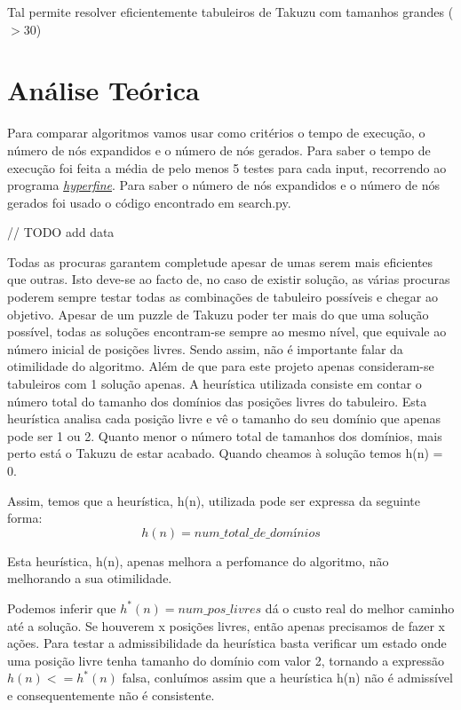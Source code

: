 \documentclass[12pt,a4paper]{article}
\begin{document}
  Tal permite resolver eficientemente tabuleiros de Takuzu com tamanhos grandes ($> 30$)
  

  \section{Análise Teórica}

  Para comparar algoritmos vamos usar como critérios o tempo de execução, o número de nós expandidos e o número de nós gerados.
  Para saber o tempo de execução foi feita a média de pelo menos 5 testes para cada input, recorrendo ao programa \href{https://github.com/sharkdp/hyperfine}{\textit{hyperfine}}.
  Para saber o número de nós expandidos e o número de nós gerados foi usado o código encontrado em search.py.

  // TODO add data

  
  Todas as procuras garantem completude apesar de umas serem mais eficientes que outras. Isto deve-se ao facto de, no caso de existir solução, as várias procuras poderem sempre testar todas as combinações de tabuleiro possíveis e chegar ao objetivo.
  Apesar de um puzzle de Takuzu poder ter mais do que uma solução possível, todas as soluções encontram-se sempre ao mesmo nível, que equivale ao número inicial de posições livres. Sendo assim, não é importante falar da otimilidade do algoritmo.
  Além de que para este projeto apenas consideram-se tabuleiros com 1 solução apenas.
  A heurística utilizada consiste em contar o número total do tamanho dos domínios das posições livres do tabuleiro.
  Esta heurística analisa cada posição livre e vê o tamanho do seu domínio que apenas pode ser 1 ou 2.
  Quanto menor o número total de tamanhos dos domínios, mais perto está o Takuzu de estar acabado.
  Quando cheamos à solução temos h(n) = 0.
  
  Assim, temos que a heurística, h(n), utilizada pode ser expressa da seguinte forma:
  $$
  h(n) = num\_total\_de\_domínios
  $$

  
  Esta heurística, h(n), apenas melhora a perfomance do algoritmo, não melhorando a sua otimilidade.

  Podemos inferir que $h^*(n) = num\_pos\_livres$ dá o custo real do melhor caminho até a solução. Se houverem x posições livres, então apenas precisamos de fazer x ações.
  Para testar a admissibilidade da heurística basta verificar um estado onde uma posição livre tenha tamanho do domínio com valor 2, tornando a expressão $h(n) <= h^*(n)$ falsa,
  conluímos assim que a heurística h(n) não é admissível e consequentemente não é consistente.
\end{document}
